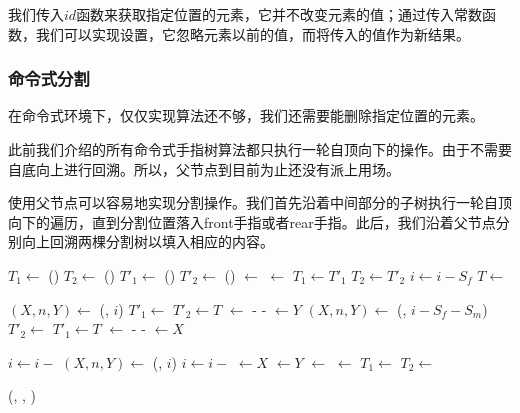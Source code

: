 \documentclass[UTF8]{article}
\begin{document}
我们传入$id$函数来获取指定位置的元素，它并不改变元素的值；通过传入常数函数，我们可以实现设置，它忽略元素以前的值，而将传入的值作为新结果。

\subsubsection{命令式分割}

在命令式环境下，仅仅实现算法还不够，我们还需要能删除指定位置的元素。

此前我们介绍的所有命令式手指树算法都只执行一轮自顶向下的操作。由于不需要自底向上进行回溯。所以，父节点到目前为止还没有派上用场。

使用父节点可以容易地实现分割操作。我们首先沿着中间部分的子树执行一轮自顶向下的遍历，直到分割位置落入front手指或者rear手指。此后，我们沿着父节点分别向上回溯两棵分割树以填入相应的内容。

\begin{algorithmic}
  \State $T_1 \gets$ ()
  \State $T_2 \gets$ ()
   
    \State $T'_1 \gets$ ()
    \State $T'_2 \gets$ ()
    \State {} $\gets$ 
    \State {} $\gets$ 
    \State {}
    \State {}
    \State $T_1 \gets T'_1$
    \State $T_2 \gets T'_2$
    \State $i \gets i - S_f$
    \State $T \gets$ 
  \EndWhile

    \State $(X, n, Y) \gets$ (, $i$)
    \State $T'_1 \gets$ 
    \State $T'_2 \gets T$
    \State {} $\gets$  -  - 
    \State {} $\gets Y$
    \State $(X, n, Y) \gets$ (, $i - S_f - S_m$)
    \State $T'_2 \gets$ 
    \State $T'_1 \gets T$
    \State {} $\gets$  -  - 
    \State {} $\gets X$
  \EndIf
  \State {}
  \State {}

  \State $i \gets i -$ 
   
    \State $(X, n, Y) \gets$ (, $i$)
    \State $i \gets i -$ 
    \State {} $\gets X$
    \State {} $\gets Y$
    \State {} $\gets$ 
    \State {} $\gets$ 
    \State $T_1 \gets$ 
    \State $T_2 \gets$ 
  \EndWhile

  \State \Return (, , )
\EndFunction
\end{algorithmic}
\end{document}
